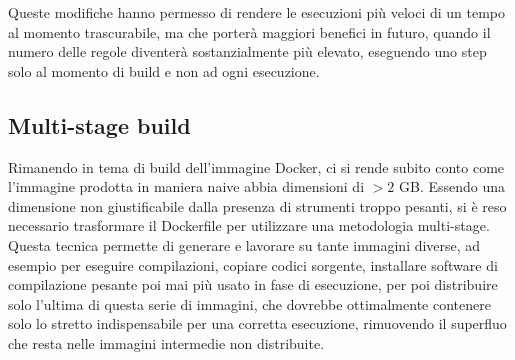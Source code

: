 Queste modifiche hanno permesso di rendere le esecuzioni più veloci di un tempo al momento trascurabile, ma che porterà maggiori benefici in futuro, quando il numero delle regole diventerà sostanzialmente più elevato, eseguendo uno step solo al momento di build e non ad ogni esecuzione.

\subsection{Multi-stage build}
Rimanendo in tema di build dell'immagine Docker, ci si rende subito conto come l'immagine prodotta in maniera naive abbia dimensioni di $>2$ GB. Essendo una dimensione non giustificabile dalla presenza di strumenti troppo pesanti, si è reso necessario trasformare il Dockerfile per utilizzare una metodologia multi-stage.
Questa tecnica permette di generare e lavorare su tante immagini diverse, ad esempio per eseguire compilazioni, copiare codici sorgente, installare software di compilazione pesante poi mai più usato in fase di esecuzione, per poi distribuire solo l'ultima di questa serie di immagini, che dovrebbe ottimalmente contenere solo lo stretto indispensabile per una corretta esecuzione, rimuovendo il superfluo che resta nelle immagini intermedie non distribuite.

